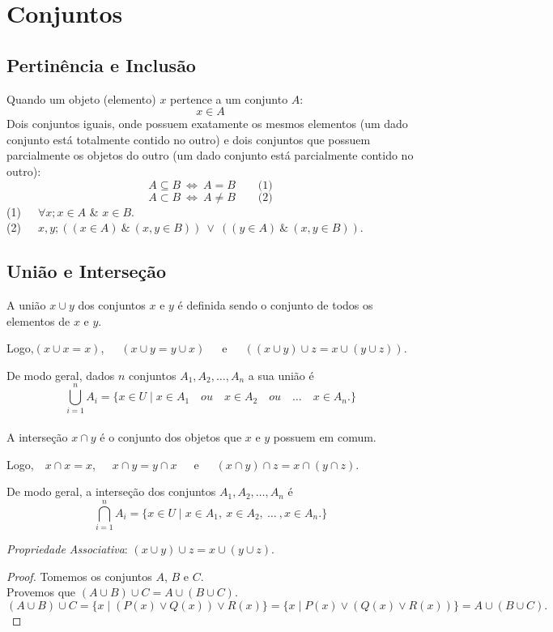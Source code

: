 \section{Conjuntos}
\subsection{Pertinência e Inclusão}

Quando um objeto (elemento) $x$ pertence a um conjunto $A$: $$x \in A$$
Dois conjuntos iguais, onde possuem exatamente os mesmos elementos (um dado conjunto está totalmente contido no outro) e dois conjuntos que possuem parcialmente os objetos do outro (um dado conjunto está parcialmente contido no outro): 
$$A \subseteq B\ \iff\ A=B\quad \quad \textrm{(1)}$$  
$$A \subset B\ \iff\ A \neq B\quad \quad \textrm{(2)}$$
(1)\ \ \ $\forall x; x \in A$ \& $x \in B$. \\
(2)\ \ \ $x,y; ((x \in A)\ \&\ (x,y \in B))\ \lor\ ((y \in A)\ \&\ (x,y \in B))$.

\subsection{União e Interseção}
A união $x \cup y$ dos conjuntos $x$ e $y$ é definida sendo o conjunto de todos os elementos de $x$ e $y$.

Logo,\quad $(x \cup x = x)$,\ \ \ $(x \cup y = y \cup x)$\ \ \ e\ \ \ $((x \cup y) \cup z = x \cup (y \cup z))$.

De modo geral, dados $n$ conjuntos $A_{1}, A_{2}, \dots, A_{n}$ a sua união é
\[
\bigcup_{i=1}^{n} A_{i} = \{x \in U \mid x \in A_{1}\quad ou\quad x \in A_{2}\quad ou\quad \dots \quad x \in A_{n}.\}
\]
\\
A interseção $x \cap y$ é o conjunto dos objetos que $x$ e $y$ possuem em comum.

Logo,\ \ $x \cap x = x$,\ \ \ $x \cap y = y \cap x$\ \ \ e\ \ \ $(x \cap y) \cap z = x \cap (y \cap z)$.

De modo geral, a interseção dos conjuntos $A_{1}, A_{2}, \dots, A_{n}$ é
\[
\bigcap_{i=1}^{n} A_{i} = \{x \in U \mid x \in A_{1},\ x \in A_{2},\  \dots\ , x \in A_{n}.\}
\]

\textit{Propriedade Associativa}: $(x \cup y) \cup z = x \cup (y \cup z)$.
\begin{proof}
  Tomemos os conjuntos $A$, $B$ e $C$.\\
  Provemos que $(A \cup B) \cup C = A \cup (B \cup C).$\\
  $(A \cup B) \cup C = \{x \mid (P(x) \lor Q(x)) \lor R(x) \} = \{x \mid P(x) \lor (Q(x) \lor R(x)) \} = A \cup (B \cup C).$
\end{proof}

